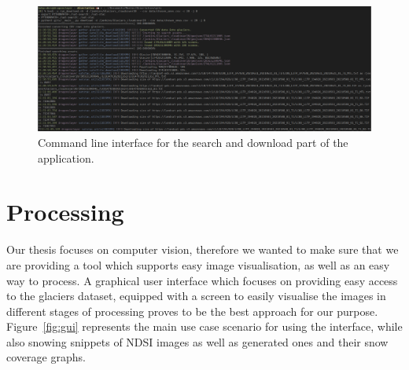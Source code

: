 \documentclass[12pt, a4paper]{report}
\begin{document}
	\begin{figure}[h!]
		\centering
		\includegraphics[width=\columnwidth]{../images/download_cmd.png}
		\caption{Command line interface for the search and download part of the application.}
		\label{fig:download_cmd}
	\end{figure}

	\section{Processing}
	
	\par Our thesis focuses on computer vision, therefore we wanted to make sure that we are providing a tool which supports easy image visualisation, as well as an easy way to process. A graphical user interface which focuses on providing easy access to the glaciers dataset, equipped with a screen to easily visualise the images in different stages of processing proves to be the best approach for our purpose. Figure~\ref{fig:gui} represents the main use case scenario for using the interface, while also snowing snippets of NDSI images as well as generated ones and their snow coverage graphs.
	
\end{document}
